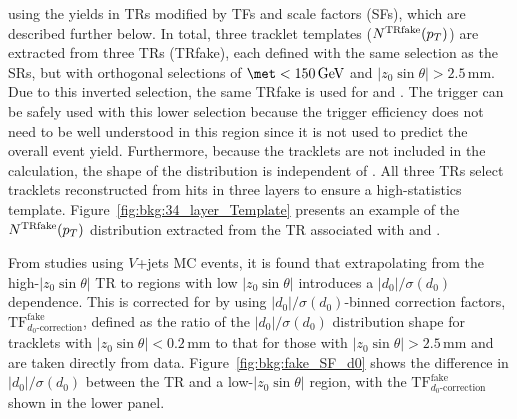 using the yields in TRs modified by TFs and scale factors (SFs), which are described further below. In total, three tracklet \pt templates ($N^{\mathrm{TRfake}}(p_T)$) are extracted from three TRs (TRfake), each defined with the same selection as the SRs, but with orthogonal selections of $\met < 150\,\GeV$ and $|z_0\sin\theta| > 2.5$\,mm. Due to this inverted \met selection, the same TRfake is used for \SRAh and \SRAm. The \met trigger can be safely used with this lower selection because the trigger efficiency does not need to be well understood in this region since it is not used to predict the overall event yield. Furthermore, because the tracklets are not included in the \met calculation, the shape of the \pt distribution is independent of \met. All three TRs select tracklets reconstructed from hits in three layers to ensure a high-statistics \pt template. Figure~\ref{fig:bkg:34_layer_Template} presents an example of the $N^{\mathrm{TRfake}}(p_T)$ distribution extracted from the TR associated with \SRAh and \SRAm.

From studies using $V$+\:\!jets MC events, it is found that extrapolating from the high-$|z_0\sin\theta|$ TR to regions with low $|z_0\sin\theta|$ introduces a $|d_0|/\sigma(d_0)$ dependence. This is corrected for by using $|d_0|/\sigma(d_0)$-binned correction factors, $\mathrm{TF}^{\mathrm{fake}}_{d_0\textrm{-correction}}$, defined as the ratio of the $|d_0|/\sigma(d_0)$ distribution shape for tracklets with $|z_0\sin\theta| < 0.2\,$mm to that for those with $|z_0\sin\theta| > 2.5\,$mm and are taken directly from data. Figure~\ref{fig:bkg:fake_SF_d0} shows the difference in $|d_0|/\sigma(d_0)$ between the TR and a low-$|z_0\sin\theta|$ region, with the $\mathrm{TF}^{\mathrm{fake}}_{d_0\textrm{-correction}}$ shown in the lower panel.

